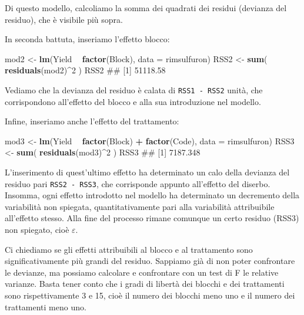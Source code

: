 \documentclass[a4paper,12pt,oneside]{book}
\newenvironment{Shaded}{\begin{snugshade}}{\end{snugshade}}
\newcommand{\KeywordTok}[1]{\textcolor[rgb]{0.13,0.29,0.53}{\textbf{#1}}}
\newcommand{\DataTypeTok}[1]{\textcolor[rgb]{0.13,0.29,0.53}{#1}}
\newcommand{\DecValTok}[1]{\textcolor[rgb]{0.00,0.00,0.81}{#1}}
\newcommand{\StringTok}[1]{\textcolor[rgb]{0.31,0.60,0.02}{#1}}
\newcommand{\OperatorTok}[1]{\textcolor[rgb]{0.81,0.36,0.00}{\textbf{#1}}}
\newcommand{\NormalTok}[1]{#1}
\theoremstyle{definition}
\theoremstyle{definition}
\theoremstyle{definition}
\theoremstyle{remark}
\begin{document}
Di questo modello, calcoliamo la somma dei quadrati dei residui
(devianza del residuo), che è visibile più sopra.

In seconda battuta, inseriamo l'effetto blocco:

\begin{Shaded}
\begin{Highlighting}[]
\NormalTok{mod2 <-}\StringTok{ }\KeywordTok{lm}\NormalTok{(Yield }\OperatorTok{~}\StringTok{ }\KeywordTok{factor}\NormalTok{(Block), }\DataTypeTok{data =}\NormalTok{ rimsulfuron)}
\NormalTok{RSS2 <-}\StringTok{ }\KeywordTok{sum}\NormalTok{( }\KeywordTok{residuals}\NormalTok{(mod2)}\OperatorTok{^}\DecValTok{2}\NormalTok{ )}
\NormalTok{RSS2}
\NormalTok{## [1] 51118.58}
\end{Highlighting}
\end{Shaded}

Vediamo che la devianza del residuo è calata di \texttt{RSS1\ -\ RSS2}
unità, che corrispondono all'effetto del blocco e alla sua introduzione
nel modello.

Infine, inseriamo anche l'effetto del trattamento:

\begin{Shaded}
\begin{Highlighting}[]
\NormalTok{mod3 <-}\StringTok{ }\KeywordTok{lm}\NormalTok{(Yield }\OperatorTok{~}\StringTok{ }\KeywordTok{factor}\NormalTok{(Block) }\OperatorTok{+}\StringTok{ }\KeywordTok{factor}\NormalTok{(Code),}
           \DataTypeTok{data =}\NormalTok{ rimsulfuron)}
\NormalTok{RSS3 <-}\StringTok{ }\KeywordTok{sum}\NormalTok{( }\KeywordTok{residuals}\NormalTok{(mod3)}\OperatorTok{^}\DecValTok{2}\NormalTok{ )}
\NormalTok{RSS3}
\NormalTok{## [1] 7187.348}
\end{Highlighting}
\end{Shaded}

L'inserimento di quest'ultimo effetto ha determinato un calo della
devianza del residuo pari \texttt{RSS2\ -\ RSS3}, che corrisponde
appunto all'effetto del diserbo. Insomma, ogni effetto introdotto nel
modello ha determinato un decremento della variabilità non spiegata,
quantitativamente pari alla variabilità attribuibile all'effetto stesso.
Alla fine del processo rimane comunque un certo residuo (RSS3) non
spiegato, cioè \(\varepsilon\).

Ci chiediamo se gli effetti attribuibili al blocco e al trattamento sono
significativamente più grandi del residuo. Sappiamo già di non poter
confrontare le devianze, ma possiamo calcolare e confrontare con un test
di F le relative varianze. Basta tener conto che i gradi di libertà dei
blocchi e dei trattamenti sono rispettivamente 3 e 15, cioè il numero
dei blocchi meno uno e il numero dei trattamenti meno uno.
\end{document}
